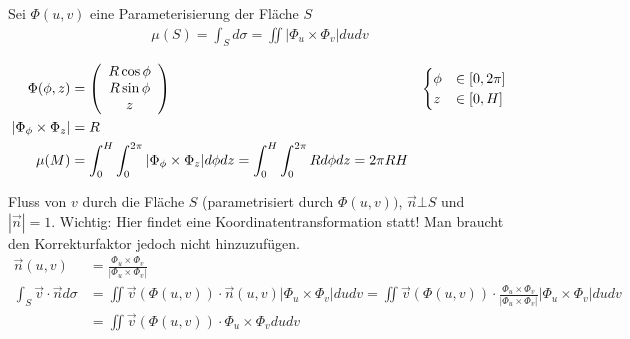 \documentclass[a4paper]{article}
\begin{document}
		\begin{fdef}
			Sei $\Phi(u,v)$ eine Parameterisierung der Fläche $S$
			\begin{align*}
				\mu(S)= \int_S d \sigma = \iint |\Phi_u \times \Phi_v| du dv
			\end{align*}
		\end{fdef}
		\begin{fmerke}
			\begin{align*}
				\Phi(\phi, z) &= \left( \begin{array}{c} R \cos \phi \\ R \sin \phi \\ z \end{array} \right) 
					&\begin{cases} \phi &\in [0,2\pi] \\ z &\in [0,H] \end{cases}  \\
				|\Phi_\phi \times \Phi_z | &= R\\
				\mu(M) &= \int_0^H \int_0^{2\pi} |\Phi_\phi \times \Phi_z| d \phi dz = \int_0^H \int_0^{2\pi} R d \phi dz =  2\pi R H
			\end{align*}
		\end{fmerke}

		\begin{fdef}
			Fluss von $v$ durch die Fläche $S$ (parametrisiert durch $\Phi(u,v))$, $\vec n \bot S$ und $|\vec n| = 1$. Wichtig: Hier findet eine Koordinatentransformation statt! Man braucht den Korrekturfaktor jedoch nicht hinzuzufügen.
			\begin{align*}
			 	\vec n(u,v) &= \frac{ \Phi_u \times \Phi_v }{|\Phi_u \times \Phi_v|}\\
			 	\int_S \vec v \cdot \vec n d\sigma &= \iint \vec v(\Phi(u,v)) \cdot \vec n(u,v) | \Phi_u \times \Phi_v | du dv
			 	= \iint \vec v(\Phi(u,v)) \cdot \frac{ \Phi_u \times \Phi_v }{|\Phi_u \times \Phi_v|} | \Phi_u \times \Phi_v | du dv\\
			 	&= \iint \vec v(\Phi(u,v)) \cdot \Phi_u \times \Phi_v du dv
			\end{align*}
		\end{fdef}
		
\end{document}
